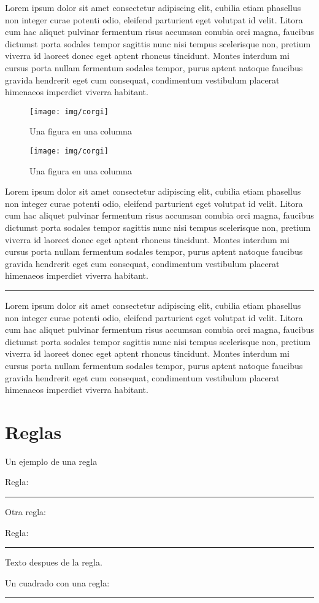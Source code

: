 \documentclass{article}
\begin{document}
	\begin{multicols}{3}
	
	Lorem ipsum dolor sit amet consectetur adipiscing elit, cubilia etiam phasellus non integer curae potenti odio, eleifend parturient eget volutpat id velit. Litora cum hac aliquet pulvinar fermentum risus accumsan conubia orci magna, faucibus dictumst porta sodales tempor sagittis nunc nisi tempus scelerisque non, pretium viverra id laoreet donec eget aptent rhoncus tincidunt. Montes interdum mi cursus porta nullam fermentum sodales tempor, purus aptent natoque faucibus gravida hendrerit eget cum consequat, condimentum vestibulum placerat himenaeos imperdiet viverra habitant.

	\begin{figure}[H] %
		\centering
		\texttt{[image: img/corgi]}
		\caption{Una figura en una columna}
		\label{fig:corgi}
	\end{figure}

	\begin{figure*}[!htp]
		\centering
		\texttt{[image: img/corgi]}
		\caption{Una figura en una columna}
		\label{fig:corgi2}
	\end{figure*}
	
	Lorem ipsum dolor sit amet consectetur adipiscing elit, cubilia etiam phasellus non integer curae potenti odio, eleifend parturient eget volutpat id velit. Litora cum hac aliquet pulvinar fermentum risus accumsan conubia orci magna, faucibus dictumst porta sodales tempor sagittis nunc nisi tempus scelerisque non, pretium viverra id laoreet donec eget aptent rhoncus tincidunt. Montes interdum mi cursus porta nullam fermentum sodales tempor, purus aptent natoque faucibus gravida hendrerit eget cum consequat, condimentum vestibulum placerat himenaeos imperdiet viverra habitant.


	\end{multicols}

	\noindent\rule{\textwidth}{2pt}
	
	Lorem ipsum dolor sit amet consectetur adipiscing elit, cubilia etiam phasellus non integer curae potenti odio, eleifend parturient eget volutpat id velit. Litora cum hac aliquet pulvinar fermentum risus accumsan conubia orci magna, faucibus dictumst porta sodales tempor sagittis nunc nisi tempus scelerisque non, pretium viverra id laoreet donec eget aptent rhoncus tincidunt. Montes interdum mi cursus porta nullam fermentum sodales tempor, purus aptent natoque faucibus gravida hendrerit eget cum consequat, condimentum vestibulum placerat himenaeos imperdiet viverra habitant.
	
	\section{Reglas}
	
	Un ejemplo de una regla
	
	Regla: \rule{\textwidth}{2pt}
	
	Otra regla:
	
	Regla:	\rule[-2mm]{100pt}{3pt} Texto despues de la regla.
	
	Un cuadrado con una regla:
	\rule{5pt}{5pt}
\end{document}
